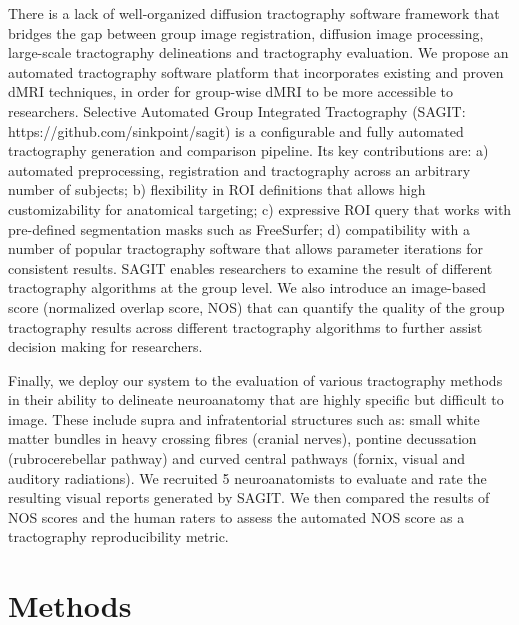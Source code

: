 There is a lack of well-organized diffusion tractography software framework that bridges the gap between group image registration, diffusion image processing, large-scale tractography delineations and tractography evaluation. We propose an automated tractography software platform that incorporates existing and proven dMRI techniques, in order for group-wise dMRI to be more accessible to researchers. Selective Automated Group Integrated Tractography (SAGIT: https://github.com/sinkpoint/sagit) is a configurable and fully automated tractography generation and comparison pipeline. Its key contributions are: a) automated preprocessing, registration and tractography across an arbitrary number of subjects; b) flexibility in ROI definitions that allows high customizability for anatomical targeting; c) expressive ROI query that works with pre-defined segmentation masks such as FreeSurfer; d) compatibility with a number of popular tractography software that allows parameter iterations for consistent results.  SAGIT enables researchers to examine the result of different tractography algorithms at the group level.  We also introduce an image-based score (normalized overlap score, NOS) that can quantify the quality of the group tractography results across different tractography algorithms to further assist decision making for researchers.

Finally, we deploy our system to the evaluation of various tractography methods in their ability to delineate neuroanatomy that are highly specific but difficult to image. These include supra and infratentorial structures such as: small white matter bundles in heavy crossing fibres (cranial nerves), pontine decussation (rubrocerebellar pathway) and curved central pathways (fornix, visual and auditory radiations). We recruited 5 neuroanatomists to evaluate and rate the resulting visual reports generated by SAGIT. We then compared the results of NOS scores and the human raters to assess the automated NOS score as a tractography reproducibility metric. 

\section{Methods}


